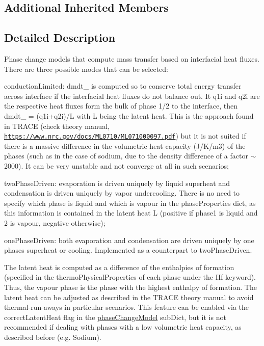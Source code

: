 \subsection*{Additional Inherited Members}


\subsection{Detailed Description}
Phase change models that compute mass transfer based on interfacial heat fluxes. There are three possible modes that can be selected\+: 

\label{_Description}%

\begin{DoxyItemize}
\item conduction\+Limited\+: dmdt\+\_\+ is computed so to conserve total energy transfer across interface if the interfacial heat fluxes do not balance out. It q1i and q2i are the respective heat fluxes form the bulk of phase 1/2 to the interface, then dmdt\+\_\+ = (q1i+q2i)/L with L being the latent heat. This is the approach found in T\+R\+A\+CE (check theory manual, \href{https://www.nrc.gov/docs/ML0710/ML071000097.pdf}{\tt https\+://www.\+nrc.\+gov/docs/\+M\+L0710/\+M\+L071000097.\+pdf}) but it is not suited if there is a massive difference in the volumetric heat capacity (J/\+K/m3) of the phases (such as in the case of sodium, due to the density difference of a factor $\sim$ 2000). It can be very unstable and not converge at all in such scenarios;
\item two\+Phase\+Driven\+: evaporation is driven uniquely by liquid superheat and condensation is driven uniquely by vapor undercooling. There is no need to specify which phase is liquid and which is vapour in the phase\+Properties dict, as this information is contained in the latent heat L (positive if phase1 is liquid and 2 is vapour, negative otherwise);
\item one\+Phase\+Driven\+: both evaporation and condensation are driven uniquely by one phase\textquotesingle{}s superheat or cooling. Implemented as a counterpart to two\+Phase\+Driven.
\end{DoxyItemize}

The latent heat is computed as a difference of the enthalpies of formation (specified in the thermo\+Physical\+Properties of each phase under the Hf keyword). Thus, the vapour phase is the phase with the highest enthalpy of formation. The latent heat can be adjusted as described in the T\+R\+A\+CE theory manual to avoid thermal-\/run-\/aways in particular scenarios. This feature can be enabled via the correct\+Latent\+Heat flag in the \hyperlink{classFoam_1_1phaseChangeModel}{phase\+Change\+Model} sub\+Dict, but it is not recommended if dealing with phases with a low volumetric heat capacity, as described before (e.\+g. Sodium).

